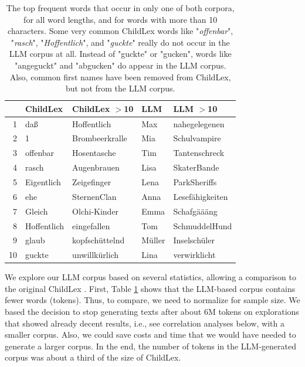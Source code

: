 \documentclass[jou, a4paper]{apa7}
\begin{document}
\begin{table}[ht]
\caption{The top frequent words that occur in only one of both corpora, for all word lengths, and for words with more than 10 characters. Some very common ChildLex words like "\textit{offenbar}", "\textit{rasch}", "\textit{Hoffentlich}", and "\textit{guckte}" really do not occur in the LLM corpus at all. Instead of "guckte" or "gucken", words like "angeguckt" and "abgucken" do appear in the LLM corpus. Also, common first names have been removed from ChildLex, but not from the LLM corpus.}
\centering
\begin{tabular}{rllll}
  \hline
 & ChildLex & ChildLex $>$10 & LLM & LLM $>$10 \\ 
  \hline
1 & daß & Hoffentlich & Max & nahegelegenen \\ 
  2 & 1 & Brombeerkralle & Mia & Schulvampire \\ 
  3 & offenbar & Hosentasche & Tim & Tantenschreck \\ 
  4 & rasch & Augenbrauen & Lisa & SkaterBande \\ 
  5 & Eigentlich & Zeigefinger & Lena & ParkSheriffs \\ 
  6 & ehe & SternenClan & Anna & Lesefähigkeiten \\ 
  7 & Gleich & Olchi-Kinder & Emma & Schafgäääng \\ 
  8 & Hoffentlich & eingefallen & Tom & SchmuddelHund \\ 
  9 & glaub & kopfschüttelnd & Müller & Inselschüler \\ 
  10 & guckte & unwillkürlich & Lina & verwirklicht \\ 
   \hline
\end{tabular}
\label{freqComp}
\end{table}

We explore our LLM corpus based on several statistics, allowing a comparison to the original ChildLex \citep{schroeder_childlex_2015}. First, Table \ref{freqComp} shows that the LLM-based corpus contains fewer words (tokens). Thus, to compare, we need to normalize for sample size. We based the decision to stop generating texts after about 6M tokens on explorations that showed already decent results, i.e., see correlation analyses below, with a smaller corpus. Also, we could save costs and time that we would have needed to generate a larger corpus. In the end, the number of tokens in the LLM-generated corpus was about a third of the size of ChildLex.
\end{document}
